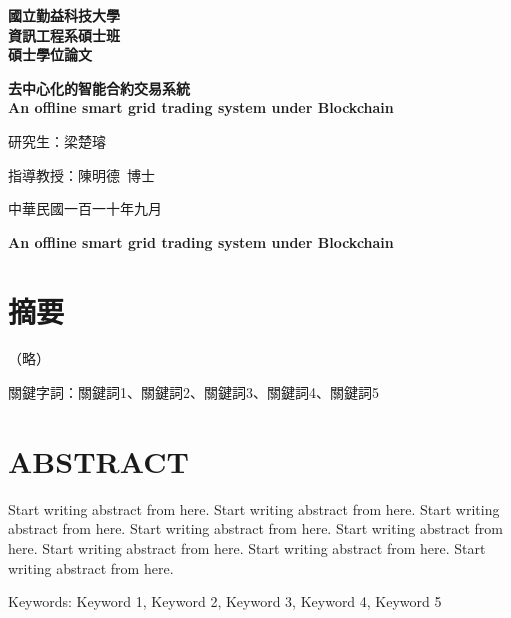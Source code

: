 \let\oldthesection\thesection
\renewcommand{\thesection}{}

\begin{titlepage}
	\renewcommand{\baselinestretch}{1.2}
	\begin{center}
		\Huge
		\textbf{國立勤益科技大學\\
			\vspace{1mm}
			資訊工程系碩士班\\
			\vspace{1mm}
			碩士學位論文}

		\vspace{2cm}
		\Huge
		\bfseries
		去中心化的智能合約交易系統\\
		{\LARGE An offline smart grid trading system under Blockchain}

		\vspace{1.5cm}

		\LARGE
		研究生：梁楚璿
		\vspace{1.5cm}

		指導教授：陳明德\ 博士

		\vfill

		中華民國一百一十年九月

	\end{center}
	\newpage
\end{titlepage}

\begin{center} %
	\Large
	\textbf{An offline smart grid trading system under Blockchain}
\end{center}

\section{摘要}
\begin{center}
	（略）
\end{center}

\noindent 關鍵字詞：關鍵詞1、關鍵詞2、關鍵詞3、關鍵詞4、關鍵詞5

\newpage

\section{ABSTRACT}
Start writing abstract from here. Start writing abstract from here. Start writing abstract from here. Start writing abstract from here. Start writing abstract from here. Start writing abstract from here. Start writing abstract from here. Start writing abstract from here.

Keywords: Keyword 1, Keyword 2, Keyword 3, Keyword 4, Keyword 5

\newpage

\tableofcontents
\newpage

\listoftables
\newpage

\listoffigures
\newpage


\setcounter{section}{0} %
\renewcommand{\thesection}{\oldthesection}